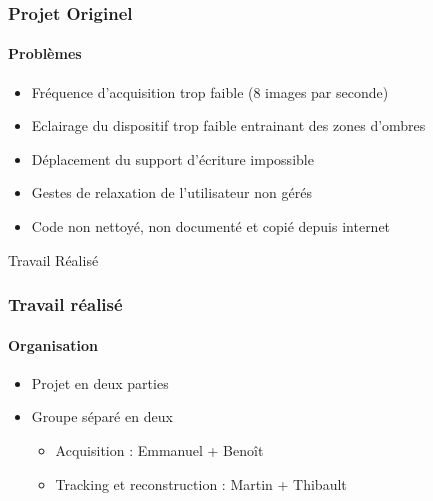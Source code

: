 \documentclass[12pt]{beamer}
\begin{document}
\begin{frame}
\frametitle{Projet Originel}
\framesubtitle{Problèmes}
\begin{itemize}
\item Fréquence d'acquisition trop faible (8 images par seconde)
\item Eclairage du dispositif trop faible entrainant des zones d'ombres
\item Déplacement du support d'écriture impossible
\item Gestes de relaxation de l'utilisateur non gérés
\item Code non nettoyé, non documenté et copié depuis internet
\end{itemize}
\end{frame}

\begin{frame}
\Huge{\centerline{Travail Réalisé}}
\end{frame}

\begin{frame}
\frametitle{Travail réalisé}
\framesubtitle{Organisation}
\begin{itemize}
\item Projet en deux parties
\item Groupe séparé en deux
	\begin{itemize}
	\item Acquisition : Emmanuel + Benoît
	\item Tracking et reconstruction : Martin + Thibault
	\end{itemize}
\end{itemize}
\end{frame}
\end{document}
